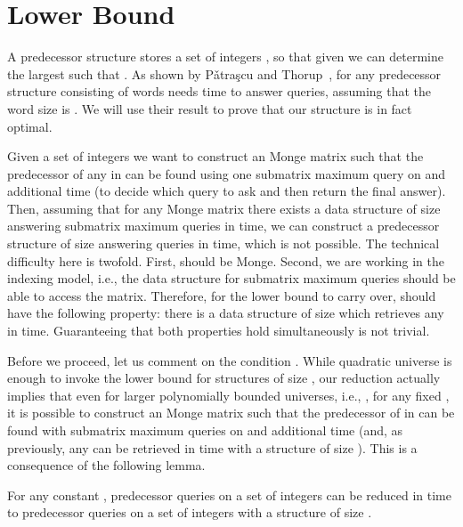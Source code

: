 \documentclass{llncs}
\begin{document}
\section{Lower Bound}
\label{sec:lower bound}
A predecessor structure stores a set of  integers , so that given  we can determine the largest 
such that . As shown by P{\v{a}}tra{\c{s}}cu and Thorup~\cite{PT2006}, for 
any predecessor structure consisting of  words needs  time to answer queries,
assuming that the word size is . We will use their result to prove that our structure is in fact optimal.

Given a set of  integers  we want to construct an  Monge matrix  such that the predecessor of
any  in  can be found using one submatrix maximum query on  and  additional time (to decide which query to ask
and then return the final answer). Then, assuming that for any  Monge matrix there exists a data structure of size 
answering submatrix maximum queries in  time, we can construct a predecessor structure
of size  answering queries in  time, which is not possible.
The technical difficulty here is twofold. First,  should be Monge. Second, we are working in the indexing model, i.e., the
data structure for submatrix maximum queries should be able to access the matrix. Therefore, for the lower bound to carry over,  should have the following
property: there is a data structure of size  which retrieves any  in  time. Guaranteeing
that both properties hold simultaneously is not trivial. 

Before we proceed, let us comment on the condition . While quadratic universe is enough to invoke
the  lower bound for structures of size
, our reduction actually implies  that even for larger
polynomially bounded universes, i.e., , for any
fixed , it is possible to construct an  Monge matrix 
such that the predecessor of  in  can be found with  submatrix maximum queries on  and 
additional time (and, as previously, any  can be retrieved in
 time with a structure of size ). This is a consequence of the following lemma. 


\begin{lemma}
\label{lem:universe reduction}
For any constant , predecessor queries on a set of  integers  can be reduced in  time to 
predecessor queries on a set of  integers  with a structure of size .
\end{lemma}
\end{document}
